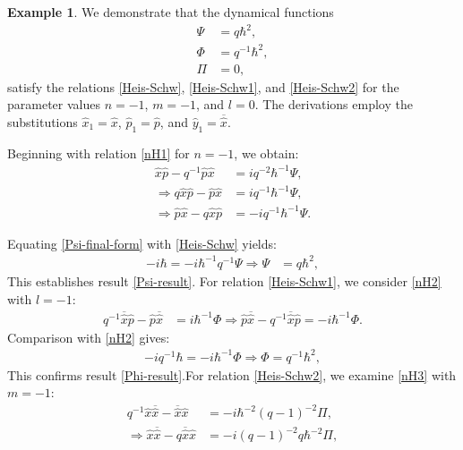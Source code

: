 \documentclass[12pt,a4paper]{article}
\theoremstyle{plain}
\theoremstyle{definition}
\newtheorem{example}[theorem]{Example}
\theoremstyle{remark}
\begin{document}
\begin{example}
We demonstrate that the dynamical functions
\begin{align}
\Psi &= q\hbar^{2}, \label{Psi-result} \\
\Phi &= q^{-1}\hbar^{2}, \label{Phi-result} \\
\Pi &= 0, \label{Pi-result}
\end{align}
satisfy the relations \eqref{Heis-Schw}, \eqref{Heis-Schw1}, and \eqref{Heis-Schw2} for the parameter values \( n = -1 \), \( m = -1 \), and \( l = 0 \). The derivations employ the substitutions \( \hat{x}_{1} = \hat{x} \), \( \hat{p}_{1} = \hat{p} \), and \( \hat{y}_{1} = \overline{\hat{x}} \).

Beginning with relation \eqref{nH1} for \( n = -1 \), we obtain:
\begin{align}
\hat{x}\hat{p} - q^{-1}\hat{p}\hat{x} &= iq^{-2}\hbar^{-1}\Psi , \label{Psi-start} \\
\Rightarrow q\hat{x}\hat{p} - \hat{p}\hat{x} &= iq^{-1}\hbar^{-1}\Psi , \label{Psi-intermediate} \\
\Rightarrow \hat{p}\hat{x} - q\hat{x}\hat{p} &= -iq^{-1}\hbar^{-1}\Psi . \label{Psi-final-form}
\end{align}

Equating \eqref{Psi-final-form} with \eqref{Heis-Schw} yields:
\begin{align*}
-i\hbar = -i\hbar^{-1}q^{-1}\Psi  %
\Rightarrow \Psi &= q\hbar^{2} ,%
\end{align*}
This establishes result \eqref{Psi-result}. For relation \eqref{Heis-Schw1}, we consider \eqref{nH2} with \( l = -1 \):
\begin{align*}
q^{-1}\overline{\hat{x}}\hat{p} - \hat{p}\overline{\hat{x}} &= i\hbar^{-1}\Phi %
\Rightarrow \hat{p}\overline{\hat{x}} - q^{-1}\overline{\hat{x}}\hat{p} = -i\hbar^{-1}\Phi .%
\end{align*}
Comparison with \eqref{nH2} gives:
\begin{align*}
-iq^{-1}\hbar = -i\hbar^{-1}\Phi %
\Rightarrow \Phi = q^{-1}\hbar^{2} ,%
\end{align*}
This confirms result \eqref{Phi-result}.For relation \eqref{Heis-Schw2}, we examine \eqref{nH3} with \( m = -1 \):
\begin{align*}
q^{-1}\hat{x}\overline{\hat{x}} - \overline{\hat{x}}\hat{x} &= -i\hbar^{-2}(q-1)^{-2}\Pi , \label{Pi-start} \\
\Rightarrow \hat{x}\overline{\hat{x}} - q\overline{\hat{x}}\hat{x} &= -i(q-1)^{-2}q\hbar^{-2}\Pi , %
\end{align*}


\end{example}
\end{document}
